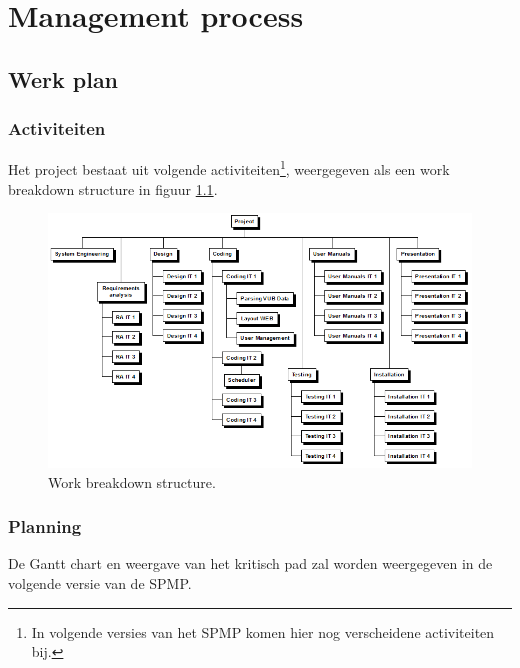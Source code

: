 \chapter{Management process}
\section{Werk plan} \label{sec:workplan}
\subsection{Activiteiten}
Het project bestaat uit volgende activiteiten\footnote{In volgende versies van het SPMP komen hier nog verscheidene activiteiten bij.}, weergegeven als een work breakdown structure in figuur \ref{fig:workbreakdownstructure}.
\begin{figure} [H]
    \centering
    \includegraphics[width = \textwidth]{ManagerialProcess/WBSChart.png}
    \caption{Work breakdown structure.}
\label{fig:workbreakdownstructure}
\end{figure}
\subsection{Planning}
De Gantt chart en weergave van het kritisch pad zal worden weergegeven in de volgende versie van de SPMP.


